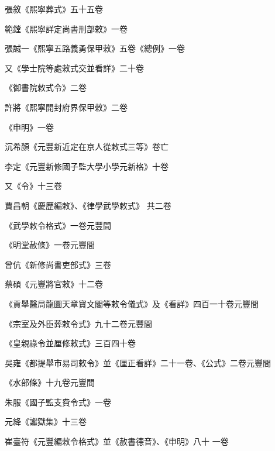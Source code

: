 \begin{pinyinscope}
 張敘《熙寧葬式》五十五卷



 範鏜《熙寧詳定尚書刑部敕》一卷



 張誠一《熙寧五路義勇保甲敕》五卷《總例》一卷



 又《學士院等處敕式交並看詳》二十卷



 《御書院敕式令》二卷



 許將《熙寧開封府界保甲敕》二卷



 《申明》一卷



 沉希顏《元豐新近定在京人從敕式三等》卷亡



 李定《元豐新修國子監大學小學元新格》十卷



 又《令》十三卷



 賈昌朝《慶歷編敕》、《律學武學敕式》
 共二卷



 《武學敕令格式》一卷元豐間



 《明堂赦條》一卷元豐間



 曾伉《新修尚書吏部式》三卷



 蔡碩《元豐將官敕》十二卷



 《貢舉醫局龍圖天章寶文閣等敕令儀式》及《看詳》四百一十卷元豐間



 《宗室及外臣葬敕令式》九十二卷元豐間



 《皇親祿令並厘修敕式》三百四十卷



 吳雍《都提舉市易司敕令》並《厘正看詳》二十一卷、《公式》二卷元豐間



 《水部條》十九卷元豐間



 朱服《國子監支費令式》一卷



 元絳《讞獄集》十三卷



 崔臺符《元豐編敕令格式》並《赦書德音》、《申明》八十
 一卷




\end{pinyinscope}
